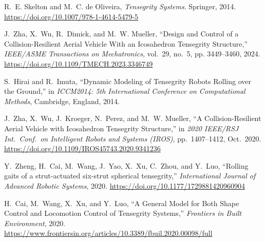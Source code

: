 \documentclass[12pt,letterpaper]{article}
\begin{document}
\begin{thebibliography}{99}

R.~E. Skelton and M.~C. de Oliveira,
\textit{Tensegrity Systems}.
Springer, 2014.
\url{https://doi.org/10.1007/978-1-4614-5479-5}

J.~Zha, X.~Wu, R.~Dimick, and M.~W. Mueller,
``Design and Control of a Collision-Resilient Aerial Vehicle With an Icosahedron Tensegrity Structure,''
\textit{IEEE/ASME Transactions on Mechatronics}, vol.~29, no.~5, pp. 3449--3460, 2024.
\url{https://doi.org/10.1109/TMECH.2023.3346749}

S.~Hirai and R.~Imuta,
``Dynamic Modeling of Tensegrity Robots Rolling over the Ground,''
in \textit{ICCM2014: 5th International Conference on Computational Methods}, Cambridge, England, 2014.

J.~Zha, X.~Wu, J.~Kroeger, N.~Perez, and M.~W. Mueller,
``A Collision-Resilient Aerial Vehicle with Icosahedron Tensegrity Structure,''
in \textit{2020 IEEE/RSJ Int.\ Conf.\ on Intelligent Robots and Systems (IROS)},
pp.~1407--1412, Oct.\ 2020.
\url{https://doi.org/10.1109/IROS45743.2020.9341236}

Y.~Zheng, H.~Cai, M.~Wang, J.~Yao, X.~Xu, C.~Zhou, and Y.~Luo,
``Rolling gaits of a strut-actuated six-strut spherical tensegrity,''
\textit{International Journal of Advanced Robotic Systems}, 2020.
\url{https://doi.org/10.1177/1729881420960904}

H.~Cai, M.~Wang, X.~Xu, and Y.~Luo,
``A General Model for Both Shape Control and Locomotion Control of Tensegrity Systems,''
\textit{Frontiers in Built Environment}, 2020.
\url{https://www.frontiersin.org/articles/10.3389/fbuil.2020.00098/full}

\end{thebibliography}

\thispagestyle{ack_footer}
\end{document}
